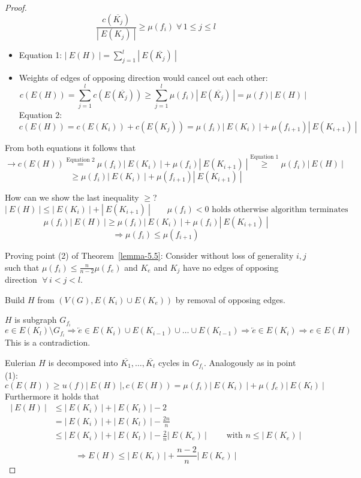 \documentclass[a4paper]{article}
\theoremstyle{definition}
\newcommand{\card}[1]{\left|\:\!#1\:\!\right|}
\newcommand{\fall}{\;\forall\,}
\begin{document}
\begin{proof}
  \[ \frac{c(\overline{K_j})}{\card{E(K_j)}} \geq \mu(f_i) \fall 1 \leq j \leq l \]
  \begin{itemize}
    \item Equation 1:
      $\card{E(H)} = \sum_{j=1}^l \card{E(\overline{K_j})}$
    \item Weights of edges of opposing direction would cancel out each other:
      \[ c(E(H)) = \sum_{j=1}^l c(E(\overline{K_j}))
        \geq \sum_{j=1}^l \mu(f_i) \card{E(\overline{K_j})} = \mu(f) \card{E(H)} \]
      Equation 2:
      \[ c(E(H)) = c(E(K_i)) + c(E(K_{j})) = \mu(f_i) \card{E(K_i)} + \mu(f_{i+1}) \card{E(K_{i+1})} \]
  \end{itemize}
  From both equations it follows that
  \[
    \rightarrow c(E(H))
      \stackrel{\text{Equation 2}}{=} \mu(f_i) \card{E(K_i)} + \mu(f_i) \card{E(K_{i+1})}
      \stackrel{\text{Equation 1}}{\geq} \mu(f_i) \card{E(H)}
  \] \[
      \geq \mu(f_i) \card{E(K_i)} + \mu(f_{i+1}) \card{E(K_{i+1})}
  \]

  How can we show the last inequality $\geq$?
  \[
    \card{E(H)} \leq \card{E(K_i)} + \card{E(K_{i+1})} \qquad \mu(f_i) < 0 \text{ holds otherwise algorithm terminates}
  \] \[
    \mu(f_i) \card{E(H)} \geq \mu(f_i) \card{E(K_i)} + \mu(f_i) \card{E(K_{i+1})}
  \] \[
    \Rightarrow \mu(f_i) \leq \mu(f_{i+1})
  \]

  Proving point (2) of Theorem~\ref{lemma-5.5}: Consider without loss of generality $i,j$ such that $\mu(f_i) \leq \frac{n}{n-2} \mu(f_e)$ and $K_e$ and $K_j$ have no edges of opposing direction $\fall i < j < l$.

  Build $H$ from $(V(G), E(K_i) \cup E(K_e))$ by removal of opposing edges.

  $H$ is subgraph $G_{f_i}$
  \[ e \in E(K_l) \setminus G_{f_i} \Rightarrow \overleftarrow{e} \in E(K_i) \cup E(K_{i-1}) \cup \ldots \cup E(K_{l-1}) \Rightarrow \overleftarrow{e} \in E(K_i) \Rightarrow e \in E(H) \]
  This is a contradiction.

  Eulerian $H$ is decomposed into $\overline{K_1}, \ldots, \overline{K_t}$ cycles in $G_{f_i}$.
  Analogously as in point (1):
  \[ c(E(H)) \geq u(f) \card{E(H)}, c(E(H)) = \mu(f_i) \card{E(K_i)} + \mu(f_e) \card{E(K_l)} \]
  Furthermore it holds that
  \begin{align*}
    \card{E(H)}
      & \leq \card{E(K_i)} + \card{E(K_l)} - 2 \\
      & = \card{E(K_i)} + \card{E(K_l)} - \frac{2n}{n} \\
      & \leq \card{E(K_i)} + \card{E(K_l)} - \frac2n \card{E(K_e)} \qquad \text{ with } n \leq \card{E(K_e)} \\
  \end{align*}
  \[
    \Rightarrow E(H) \leq \card{E(K_i)} + \frac{n-2}{n} \card{E(K_e)}
  \]


\end{proof}
\end{document}
